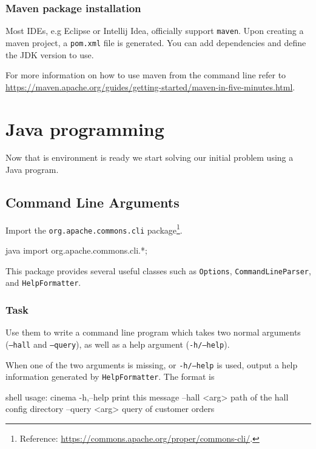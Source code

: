 \documentclass[11pt,a4paper]{article}
\begin{document}
\subsubsection{Maven package installation}

Most IDEs, e.g Eclipse or Intellij Idea, officially support \texttt{maven}. Upon creating a maven project, a \texttt{pom.xml} file is generated. You can add dependencies and define the JDK version to use.\smallskip


For more information on how to  use maven from the command line refer to \url{https://maven.apache.org/guides/getting-started/maven-in-five-minutes.html}.

\section{Java programming}

Now that is environment is ready we start solving our initial problem using a Java program.

\subsection{Command Line Arguments}\label{cli}

Import the \texttt{org.apache.commons.cli} package\footnote{Reference: \url{https://commons.apache.org/proper/commons-cli/}.}. 
\begin{inlinecbox}{java}
import org.apache.commons.cli.*;
\end{inlinecbox}

This package provides several useful classes such as \texttt{Options}, \texttt{CommandLineParser}, and \texttt{HelpFormatter}.

\subsubsection*{Task}

Use them to write a command line program which takes two normal arguments (\texttt{--hall} and \texttt{--query}), as well as a help argument (\texttt{-h/--help}).

When one of the two arguments is missing, or \texttt{-h/--help} is used, output a help information generated by \texttt{HelpFormatter}. The format is
\begin{inlinecbox}{shell}
usage: cinema
 -h,--help          print this message
    --hall <arg>    path of the hall config directory
    --query <arg>   query of customer orders
\end{inlinecbox}
\end{document}
